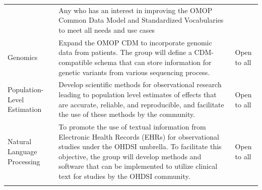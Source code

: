 \documentclass[11pt]{book}
\theoremstyle{definition}
\theoremstyle{definition}
\theoremstyle{definition}
\theoremstyle{remark}
\begin{document}
\begin{longtable}[]{@{}lll@{}}
\begin{minipage}[t]{0.51\columnwidth}
\end{minipage} & \begin{minipage}[t]{0.27\columnwidth}\raggedright
Any who has an interest in improving the OMOP Common Data Model and Standardized Vocabularies to meet all needs and use cases\strut
\end{minipage}\tabularnewline
\begin{minipage}[t]{0.13\columnwidth}\raggedright
Genomics\strut
\end{minipage} & \begin{minipage}[t]{0.51\columnwidth}\raggedright
Expand the OMOP CDM to incorporate genomic data from patients. The group will define a CDM-compatible schema that can store information for genetic variants from various sequencing process.\strut
\end{minipage} & \begin{minipage}[t]{0.27\columnwidth}\raggedright
Open to all\strut
\end{minipage}\tabularnewline
\begin{minipage}[t]{0.13\columnwidth}\raggedright
Population-Level Estimation\strut
\end{minipage} & \begin{minipage}[t]{0.51\columnwidth}\raggedright
Develop scientific methods for observational research leading to population level estimates of effects that are accurate, reliable, and reproducible, and facilitate the use of these methods by the community.\strut
\end{minipage} & \begin{minipage}[t]{0.27\columnwidth}\raggedright
Open to all\strut
\end{minipage}\tabularnewline
\begin{minipage}[t]{0.13\columnwidth}\raggedright
Natural Language Processing\strut
\end{minipage} & \begin{minipage}[t]{0.51\columnwidth}\raggedright
To promote the use of textual information from Electronic Health Records (EHRs) for observational studies under the OHDSI umbrella. To facilitate this objective, the group will develop methods and software that can be implemented to utilize clinical text for studies by the OHDSI community.\strut
\end{minipage} & \begin{minipage}[t]{0.27\columnwidth}\raggedright
Open to all\strut
\end{minipage}\tabularnewline
\begin{minipage}[t]{0.13\columnwidth}\raggedright

\end{minipage}
\end{longtable}
\end{document}
